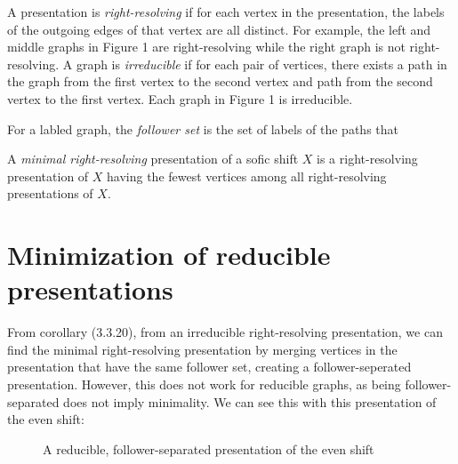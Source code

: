 \documentclass{article}
\newcommand{\term}[1]{\textit{#1}}
\begin{document}
A presentation is \term{right-resolving} if for each vertex in the presentation, the 
labels of the outgoing edges of that vertex are all distinct. For example, the left and middle graphs 
in Figure 1 are right-resolving while the right graph is not right-resolving. A graph 
is \term{irreducible} if for each pair of vertices, there exists a path in the graph 
from the first vertex to the second vertex and path from the second vertex to the first vertex.
Each graph in Figure 1 is irreducible.

For a labled graph, the \term{follower set} is the set of labels of the paths 
that 

A \term{minimal right-resolving} presentation of a sofic shift \(X\) is a 
right-resolving presentation of \(X\) having the fewest vertices among all 
right-resolving presentations of \(X\). 

\section{Minimization of reducible presentations}


From \cite{lind1995introduction} corollary (3.3.20), from an irreducible right-resolving
presentation, we can find the minimal right-resolving presentation by merging 
vertices in the presentation that have the same follower set, creating a 
follower-seperated presentation. However, this does not work for reducible graphs, as 
being follower-separated does not imply minimality. We can see this with this presentation 
of the even shift:

\begin{figure}[h]
    \centering
    \caption{A reducible, follower-separated presentation of the even shift}
\end{figure}
\end{document}
